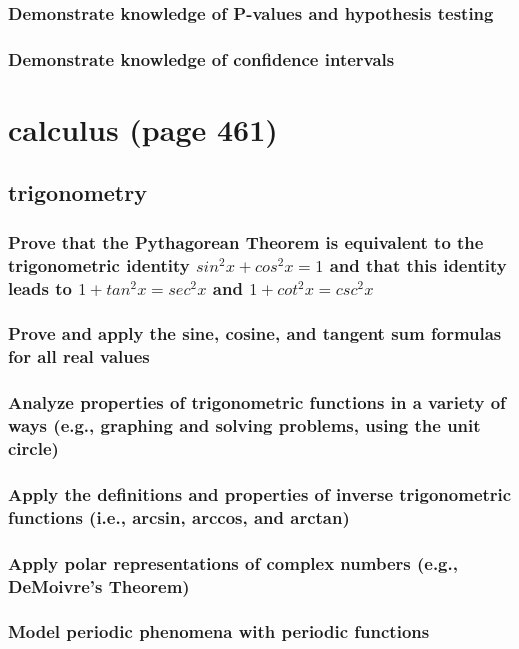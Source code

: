 \documentclass[11pt]{article}
\begin{document}
\subsubsection{Demonstrate knowledge of P-values and hypothesis testing}
\label{sec:orga3ec69a}
\subsubsection{Demonstrate knowledge of confidence intervals}
\label{sec:orgd24ed51}
\section{calculus (page 461)}
\label{sec:orgdbb2404}
\subsection{trigonometry}
\label{sec:org9267c5e}
\subsubsection{Prove that the Pythagorean Theorem is equivalent to the trigonometric identity \(sin^2x + cos^2x = 1\) and that this identity leads to \(1 + tan^2x = sec^2x\) and \(1 + cot^2x = csc^2x\)}
\label{sec:orgea648fc}
\subsubsection{Prove and apply the sine, cosine, and tangent sum formulas for all real values}
\label{sec:org67a5313}
\subsubsection{Analyze properties of trigonometric functions in a variety of ways (e.g., graphing and solving problems, using the unit circle)}
\label{sec:org694dff3}
\subsubsection{Apply the definitions and properties of inverse trigonometric functions (i.e., arcsin, arccos, and arctan)}
\label{sec:orgebd0ace}
\subsubsection{Apply polar representations of complex numbers (e.g., DeMoivre's Theorem)}
\label{sec:org5832a9c}
\subsubsection{Model periodic phenomena with periodic functions}
\label{sec:org88ae54b}
\end{document}
